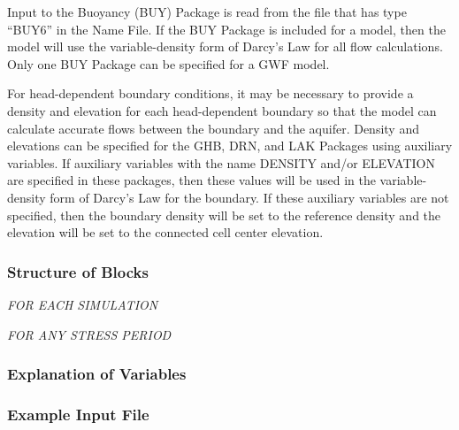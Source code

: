 Input to the Buoyancy (BUY) Package is read from the file that has type ``BUY6'' in the Name File.  If the BUY Package is included for a model, then the model will use the variable-density form of Darcy's Law for all flow calculations.  Only one BUY Package can be specified for a GWF model.

For head-dependent boundary conditions, it may be necessary to provide a density and elevation for each head-dependent boundary so that the model can calculate accurate flows between the boundary and the aquifer.  Density and elevations can be specified for the GHB, DRN, and LAK Packages using auxiliary variables.  If auxiliary variables with the name DENSITY and/or ELEVATION are specified in these packages, then these values will be used in the variable-density form of Darcy's Law for the boundary.  If these auxiliary variables are not specified, then the boundary density will be set to the reference density and the elevation will be set to the connected cell center elevation.

\vspace{5mm}
\subsubsection{Structure of Blocks}

\vspace{5mm}
\noindent \textit{FOR EACH SIMULATION}

\vspace{5mm}
\noindent \textit{FOR ANY STRESS PERIOD}


\vspace{5mm}
\subsubsection{Explanation of Variables}
\begin{description}

\end{description}

\vspace{5mm}
\subsubsection{Example Input File}


